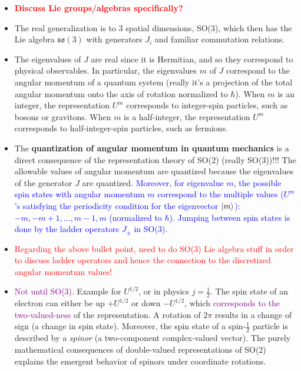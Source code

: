     \begin{itemize}
        \item \textcolor{red}{\textbf{Discuss Lie groups/algebras specifically?}}
        \item The real generalization is to 3 spatial dimensions, SO(3), which then has the Lie algebra $\mathfrak{so}(3)$ with generators $J_i$ and familiar commutation relations.
        \item The eigenvalues of $J$ are real since it is Hermitian, and so they correspond to physical observables. In particular, the eigenvalues $m$ of $J$ correspond to the angular momentum of a quantum system (really it's a projection of the total angular momentum onto the axis of rotation normalized to $\hbar$). When $m$ is an integer, the representation $U^m$ corresponds to integer-spin particles, such as bosons or gravitons. When $m$ is a half-integer, the representation $U^m$ corresponds to half-integer-spin particles, such as fermions.
        \item The \textbf{quantization of angular momentum in quantum mechanics} is a direct consequence of the representation theory of SO(2) (really SO(3))!!! The allowable values of angular momentum are quantized because the eigenvalues of the generator $J$ are quantized. \textcolor{blue}{Moreover, for eigenvalue $m$, the possible spin states with angular momentum $m$ correspond to the multiple values ($U^m$'s satisfying the periodicity condition for the eigenvector $\ket{m}$): $-m, -m+1, \dots, m-1, m$ (normalized to $\hbar$). Jumping between spin states is done by the ladder operators $J_\pm$ in SO(3).}
        \item \textcolor{red}{Regarding the above bullet point, need to do SO(3) Lie algebra stuff in order to discuss ladder operators and hence the connection to the discretized angular momentum values!}
        \item \textcolor{purple}{Not until SO(3).} Example for $U^{1/2}$, or in physics $j=\frac{1}{2}$. The spin state of an electron can either be up $+U^{1/2}$ or down $-U^{1/2}$, which \textcolor{purple}{corresponds to the two-valued-ness} of the representation. A rotation of $2\pi$ results in a change of sign (a change in spin state). Moreover, the spin state of a spin-$\frac{1}{2}$ particle is described by a \textit{spinor} (a two-component complex-valued vector). The purely mathematical consequences of double-valued representations of SO(2) explains the emergent behavior of spinors under coordinate rotations.
    \end{itemize}

